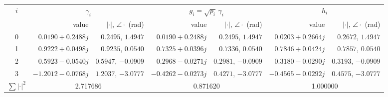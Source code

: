 \begin{tabular}{c|rr|rr|rr}
\toprule
$i$ & \multicolumn{2}{c|}{$\gamma_i$} & \multicolumn{2}{c|}{$g_i = \sqrt{p_i}\,\gamma_i$} & \multicolumn{2}{c}{$h_i$} \\
 & value & $|\cdot|$, $\angle\cdot$ (rad) & value & $|\cdot|$, $\angle\cdot$ (rad) & value & $|\cdot|$, $\angle\cdot$ (rad) \\
\midrule
0 & $0.0190 + 0.2488j$ & $0.2495$, $1.4947$ & $0.0190 + 0.2488j$ & $0.2495$, $1.4947$ & $0.0203 + 0.2664j$ & $0.2672$, $1.4947$ \\
1 & $0.9222 + 0.0498j$ & $0.9235$, $0.0540$ & $0.7325 + 0.0396j$ & $0.7336$, $0.0540$ & $0.7846 + 0.0424j$ & $0.7857$, $0.0540$ \\
2 & $0.5923 - 0.0540j$ & $0.5947$, $-0.0909$ & $0.2968 - 0.0271j$ & $0.2981$, $-0.0909$ & $0.3180 - 0.0290j$ & $0.3193$, $-0.0909$ \\
3 & $-1.2012 - 0.0768j$ & $1.2037$, $-3.0777$ & $-0.4262 - 0.0273j$ & $0.4271$, $-3.0777$ & $-0.4565 - 0.0292j$ & $0.4575$, $-3.0777$ \\
\midrule
$\sum|\cdot|^2$ & \multicolumn{2}{c|}{2.717686} & \multicolumn{2}{c|}{0.871620} & \multicolumn{2}{c}{1.000000} \\
\bottomrule
\end{tabular}
